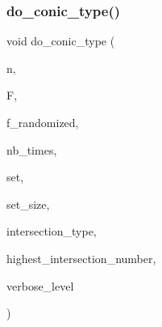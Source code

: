 \subsubsection{\texorpdfstring{do\+\_\+conic\+\_\+type()}{do\_conic\_type()}}
{\footnotesize\ttfamily void do\+\_\+conic\+\_\+type (\begin{DoxyParamCaption}\item[{\mbox{\hyperlink{galois_8h_a09fddde158a3a20bd2dcadb609de11dc}{I\+NT}}}]{n,  }\item[{\mbox{\hyperlink{classfinite__field}{finite\+\_\+field}} $\ast$}]{F,  }\item[{\mbox{\hyperlink{galois_8h_a09fddde158a3a20bd2dcadb609de11dc}{I\+NT}}}]{f\+\_\+randomized,  }\item[{\mbox{\hyperlink{galois_8h_a09fddde158a3a20bd2dcadb609de11dc}{I\+NT}}}]{nb\+\_\+times,  }\item[{\mbox{\hyperlink{galois_8h_a09fddde158a3a20bd2dcadb609de11dc}{I\+NT}} $\ast$}]{set,  }\item[{\mbox{\hyperlink{galois_8h_a09fddde158a3a20bd2dcadb609de11dc}{I\+NT}}}]{set\+\_\+size,  }\item[{\mbox{\hyperlink{galois_8h_a09fddde158a3a20bd2dcadb609de11dc}{I\+NT}} $\ast$\&}]{intersection\+\_\+type,  }\item[{\mbox{\hyperlink{galois_8h_a09fddde158a3a20bd2dcadb609de11dc}{I\+NT}} \&}]{highest\+\_\+intersection\+\_\+number,  }\item[{\mbox{\hyperlink{galois_8h_a09fddde158a3a20bd2dcadb609de11dc}{I\+NT}}}]{verbose\+\_\+level }\end{DoxyParamCaption})}

\mbox{\label{geometric__operations_8_c_ac24aca1e4d3ad6e569b36c65c94dcaad}} 
